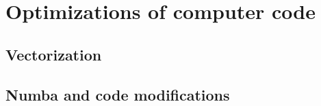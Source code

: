 \chapter{Optimizations of computer code}
\label{cha:optimizaiton}

\section{Vectorization}
\label{sec:optimizaiton_vectorization}

\section{Numba and code modifications}
\label{sec:optimizaiton_numba}